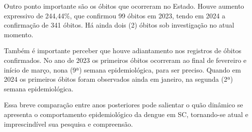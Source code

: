 \indent Outro ponto importante são os óbitos que ocorreram no Estado. Houve aumento expressivo de 244,44\%, que confirmou 99 óbitos em 2023, tendo em 2024 a confirmação de 341 óbitos. Há ainda dois (2) óbitos sob investigação no atual momento.

\indent Também é importante perceber que houve adiantamento nos registros de óbitos confirmados. No ano de 2023 os primeiros óbitos ocorreram ao final de fevereiro e início de março, nona (9ª) semana epidemiológica, para ser preciso. Quando em 2024 os primeiros óbitos foram observados ainda em janeiro, na segunda (2ª) semana epidemiológica.

\indent Essa breve comparação entre anos posteriores pode salientar o quão dinâmico se apresenta o comportamento epidemiológico da dengue em \acrlong{SC}, tornando-se atual e imprescindível sua pesquisa e compreensão.






